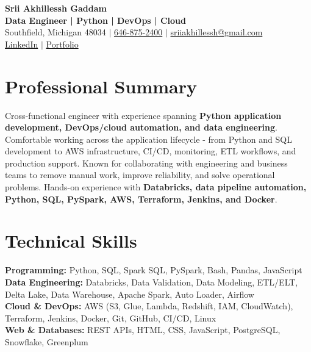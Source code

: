 \documentclass[letterpaper,10pt]{article}
\begin{document}
\fontsize{9.35pt}{10.45pt}\selectfont

\begin{center}
    {\LARGE \textbf{Srii Akhillessh Gaddam}} \\[-1pt]
    \textbf{Data Engineer | Python | DevOps | Cloud} \\[2pt]
    Southfield, Michigan 48034 $|$
    \href{tel:6468752400}{646-875-2400} $|$
    \href{mailto:sriiakhillessh@gmail.com}{sriiakhillessh@gmail.com} \\[1pt]
    \href{https://www.linkedin.com/in/srii-akhiilessh-gaddam-b48668191/}{LinkedIn} $|$
    \href{https://sriiakhillesshg.github.io/portfolio/}{Portfolio}
\end{center}
\vspace{-8pt}

\section{Professional Summary}
\small{Cross-functional engineer with experience spanning \textbf{Python application development, DevOps/cloud automation, and data engineering}. Comfortable working across the application lifecycle - from Python and SQL development to AWS infrastructure, CI/CD, monitoring, ETL workflows, and production support. Known for collaborating with engineering and business teams to remove manual work, improve reliability, and solve operational problems. Hands-on experience with \textbf{Databricks, data pipeline automation, Python, SQL, PySpark, AWS, Terraform, Jenkins, and Docker}.}

\section{Technical Skills}
\small{
\textbf{Programming:} Python, SQL, Spark SQL, PySpark, Bash, Pandas, JavaScript \\
\textbf{Data Engineering:} Databricks, Data Validation, Data Modeling, ETL/ELT, Delta Lake, Data Warehouse, Apache Spark, Auto Loader, Airflow \\
\textbf{Cloud \& DevOps:} AWS (S3, Glue, Lambda, Redshift, IAM, CloudWatch), Terraform, Jenkins, Docker, Git, GitHub, CI/CD, Linux \\
\textbf{Web \& Databases:} REST APIs, HTML, CSS, JavaScript, PostgreSQL, Snowflake, Greenplum
}
\end{document}
